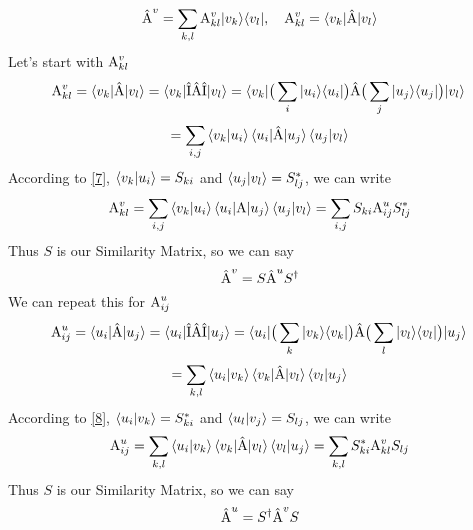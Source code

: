 \documentclass{article}
\begin{document}
\begin{equation}
    \label{8}
    \hat{\textnormal{A}}^{v} = \sum_{k,l}\textnormal{A}_{kl}^{v}|v_{k}\rangle \langle v_{l}|, \quad \textnormal{A}_{kl}^{v} = \braket{v_{k}|\hat{\textnormal{A}}|v_{l}}
\end{equation}
Let's start with $\textnormal{A}_{kl}^{v}$
\begin{equation*}
    \textnormal{A}_{kl}^{v} = \braket{v_{k}|\hat{\textnormal{A}}|v_{l}} = \braket{v_{k}|\hat{\textnormal{I}}\hat{\textnormal{A}}\hat{\textnormal{I}}|v_{l}}
    = \braket{v_{k}|\big(\sum_{i} |u_{i}\rangle \langle u_{i}| \big)\hat{\textnormal{A}}\big(\sum_{j} |u_{j}\rangle \langle u_{j}| \big)|v_{l}} \\
\end{equation*}
\begin{equation*}
    = \sum_{i,j} \braket{v_{k}|u_{i}} \braket{u_{i}| \hat{\textnormal{A}} | u_{j}} \braket{u_{j}| v_{l}}
\end{equation*}
According to \ref{7}, $\braket{v_{k}|u_{i}} = S_{ki}$ and $\braket{u_{j}| v_{l}} = S_{lj}^{*}$,
we can write
\begin{equation}
    \textnormal{A}_{kl}^{v} = \sum_{i,j} \braket{v_{k}|u_{i}} \braket{u_{i}| \textnormal{A} | u_{j}} \braket{u_{j}| v_{l}} = \sum_{i,j} S_{ki} \textnormal{A}_{ij}^{u} S_{lj}^{*}
\end{equation}
Thus $S$ is our Similarity Matrix, so we can say
\begin{equation}
    \hat{\textnormal{A}}^{v} = S\hat{\textnormal{A}}^{u}S^{\dagger}
\end{equation}
We can repeat this for $\textnormal{A}_{ij}^{u}$
\begin{equation*}
    \textnormal{A}_{ij}^{u} = \braket{u_{i}|\hat{\textnormal{A}}|u_{j}} = \braket{u_{i}|\hat{\textnormal{I}}\hat{\textnormal{A}}\hat{\textnormal{I}}|u_{j}}
    = \braket{u_{i}|\big(\sum_{k} |v_{k}\rangle \langle v_{k}| \big)\hat{\textnormal{A}}\big(\sum_{l} |v_{l}\rangle \langle v_{l}| \big)|u_{j}} \\
\end{equation*}
\begin{equation*}
    = \sum_{k,l} \braket{u_{i}|v_{k}} \braket{v_{k}| \hat{\textnormal{A}} | v_{l}} \braket{v_{l}| u_{j}}
\end{equation*}
According to \ref{8}, $\braket{u_{i}|v_{k}} = S_{ki}^{*}$ and $\braket{u_{l}| v_{j}} = S_{lj}$,
we can write
\begin{equation}
    \textnormal{A}_{ij}^{u} = \sum_{k,l} \braket{u_{i}|v_{k}} \braket{v_{k}| \hat{\textnormal{A}} | v_{l}} \braket{v_{l}| u_{j}} = \sum_{k,l} S_{ki}^{*} \textnormal{A}_{kl}^{v} S_{lj}
\end{equation}
Thus $S$ is our Similarity Matrix, so we can say
\begin{equation}
    \hat{\textnormal{A}}^{u} = S^{\dagger}\hat{\textnormal{A}}^{v}S
\end{equation}
\end{document}
